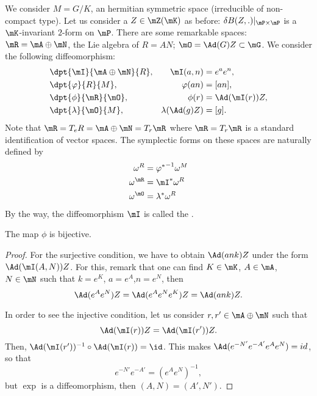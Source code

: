 We consider $M=G/K$, an hermitian symmetric space (irreducible of non-compact type). Let us consider a $Z\in\mZ(\mK)$ as before: $\delta B(Z,.)|_{\mP\times\mP}$ is a $\mK$-invariant $2$-form on $\mP$.
There are some remarkable spaces: $\mR=\mA\oplus\mN$, the Lie algebra of $R=AN$; $\mO=\Ad(G)Z\subset\mG$. We consider the following diffeomorphism:
\begin{subequations}
	\begin{align}
		 & \dpt{\mI}{\mA\oplus\mN}{R}, & \mI(a,n)         & =e^ae^n,       \\
		 & \dpt{\varphi}{R}{M},        & \varphi(an)      & =[an],         \\
		 & \dpt{\phi}{\mR}{\mO},       & \phi(r)          & =\Ad(\mI(r))Z, \\
		 & \dpt{\lambda}{\mO}{M},      & \lambda(\Ad(g)Z) & =[g].
	\end{align}
\end{subequations}
Note that $\mR=T_eR=\mA\oplus\mN=T_r\mR$ where $\mR=T_r\mR$ is a standard identification of vector spaces. The symplectic forms on these spaces are naturally defined by
\begin{subequations}
	\begin{align}
		\omega^R     & ={\varphi^*}^{-1}\omega^M \\
		\omega^{\mR} & =\mI^*\omega^R            \\
		\omega^{\mO} & =\lambda^*\omega^R
	\end{align}
\end{subequations}
%
By the way, the diffeomorphism $\mI$ is called the .

\begin{proposition}
	The map $\phi$ is bijective.
\end{proposition}

\begin{proof}
	For the surjective condition, we have to obtain $\Ad(ank)Z$ under the form $\Ad(\mI(A,N))Z$. For this, remark that one can find $K\in\mK$, $A\in\mA$, $N\in\mN$  such that $k=e^K$, $a=e^A$,$n=e^N$, then
	\[
		\Ad(e^Ae^N)Z=\Ad(e^Ae^Ne^K)Z=\Ad(ank)Z.
	\]

	In order to see the injective condition, let us consider $r,r'\in\mA\oplus\mN$ such that
	\[
		\Ad(\mI(r))Z=\Ad(\mI(r'))Z.
	\]
	Then, $\Ad(\mI(r'))^{-1}\circ\Ad(\mI(r))=\id$. This makes $\Ad(e^{-N'}e^{-A'}e^Ae^N)=id$, so that
	\[
		e^{-N'}e^{-A'}=\left(e^Ae^N\right)^{-1},
	\]
	but $\exp$ is a diffeomorphism, then $(A,N)=(A',N')$.

\end{proof}

